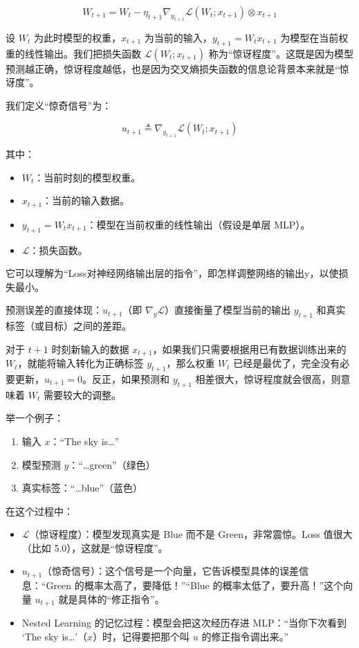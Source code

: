 \[
W_{t+1}=W_t-\eta_{t+1}\nabla_{y_{t+1}}\mathcal{L}(W_t;x_{t+1})\otimes x_{t+1}
\tag{4}
\]

设 \(W_t\) 为此时模型的权重，\(x_{t+1}\) 为当前的输入，\(y_{t+1}=W_tx_{t+1}\) 为模型在当前权重的线性输出。我们把损失函数 \(\mathcal{L}(W_t;x_{t+1})\) 称为``惊讶程度''。这既是因为模型预测越正确，惊讶程度越低，也是因为交叉熵损失函数的信息论背景本来就是``惊讶度''。

我们定义``惊奇信号''为：

\[
u_{t+1}\triangleq \nabla_{y_{t+1}}\mathcal{L}(W_t;x_{t+1})
\]

其中：

\begin{itemize}
\tightlist
\item
  \(W_t\)：当前时刻的模型权重。
\item
  \(x_{t+1}\)：当前的输入数据。
\item
  \(y_{t+1}=W_tx_{t+1}\)：模型在当前权重的线性输出（假设是单层 MLP）。
\item
  \(\mathcal{L}\)：损失函数。
\end{itemize}

它可以理解为``Loss对神经网络输出层的指令''，即怎样调整网络的输出y，以使损失最小。

预测误差的直接体现：\(u_{t+1}\)（即 \(\nabla_y\mathcal{L}\)）直接衡量了模型当前的输出 \(y_{t+1}\) 和真实标签（或目标）之间的差距。

对于 \(t+1\) 时刻新输入的数据 \(x_{t+1}\)，如果我们只需要根据用已有数据训练出来的 \(W_t\)，就能将输入转化为正确标签 \(y_{t+1}\)，那么权重 \(W_t\) 已经是最优了，完全没有必要更新，\(u_{t+1}=0\)。反正，如果预测和 \(y_{t+1}\) 相差很大，惊讶程度就会很高，则意味着 \(W_t\) 需要较大的调整。

举一个例子：

\begin{enumerate}
\def\labelenumi{\arabic{enumi}.}
\tightlist
\item
  输入 \(x\)：``The sky is\ldots{}''
\item
  模型预测 \(y\)：``\ldots green''（绿色）
\item
  真实标签：``\ldots blue''（蓝色）
\end{enumerate}

在这个过程中：

\begin{itemize}
\tightlist
\item
  \(\mathcal{L}\)（惊讶程度）：模型发现真实是 Blue 而不是 Green，非常震惊。Loss 值很大（比如 5.0），这就是``惊讶程度''。
\item
  \(u_{t+1}\)（惊奇信号）：这个信号是一个向量，它告诉模型具体的误差信息：``Green 的概率太高了，要降低！''``Blue 的概率太低了，要升高！''这个向量 \(u_{t+1}\) 就是具体的``修正指令''。
\item
  Nested Learning 的记忆过程：模型会把这次经历存进 MLP：``当你下次看到 `The sky is\ldots{}'（\(x\)）时，记得要把那个叫 \(u\) 的修正指令调出来。''
\end{itemize}

